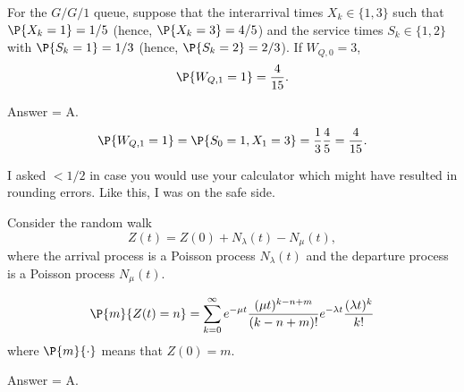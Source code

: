 \begin{exercise}[201703]
 For the $G/G/1$ queue, suppose that the interarrival times
 $X_k\in\{1,3\}$ such that $\P{X_k=1}=1/5$ (hence, $\P{X_k=3}=4/5$)
 and the service times $S_k\in\{1,2\}$ with $\P{S_k=1}=1/3$ (hence,
 $\P{S_k=2}=2/3$). If $W_{Q,0}=3$,
 \begin{equation*}
 \P{W_{Q,1} = 1} =\frac4{15}.
 \end{equation*}

\begin{solution}
 Answer = A.
 \begin{equation*}
 \P{W_{Q,1} = 1} = \P{S_0=1, X_1=3}=\frac13\frac 45 = \frac4{15}.
 \end{equation*}

 I asked $<1/2$ in case you would use your calculator which might
 have resulted in rounding errors. Like this, I was on the safe side.
\end{solution}
\end{exercise}

\begin{exercise}[201703] 
 Consider the random walk
\begin{equation*}
 Z(t) = Z(0) + N_\lambda(t) - N_\mu(t), 
\end{equation*}
where the arrival process is a Poisson process $N_\lambda(t)$ and the
departure process is a Poisson process $N_\mu(t)$. 

\begin{equation*}
 \begin{split}
 \P{m}{Z(t)=n} 
&= \sum_{k=0}^\infty e^{-\mu t} \frac{(\mu t)^{k -n+m}}{(k-n +m)!} e^{-\lambda t} \frac{(\lambda t)^k}{k!} \\
 \end{split}
\end{equation*}
where $\P{m}{\cdot}$ means that $Z(0)=m$.

\begin{solution}
 Answer = A.
\end{solution}
\end{exercise}


